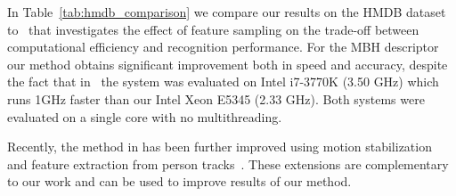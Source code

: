 \documentclass[10pt,twocolumn,letterpaper]{article}
\begin{document}
In Table~\ref{tab:hmdb_comparison} we compare our results on the HMDB dataset to~\cite{Feng13} that investigates the effect of feature sampling on the trade-off between computational efficiency and recognition performance. For the MBH descriptor our method obtains significant improvement both in speed and accuracy, despite the fact that in~\cite{Feng13} the system was evaluated on Intel i7-3770K (3.50 GHz) which runs 1GHz faster than our Intel Xeon E5345 (2.33 GHz). Both systems were evaluated on a single core with no multithreading.



Recently, the method in \cite{Wang12} has been further improved using motion stabilization~\cite{Jain13,Wang13} and feature extraction from person tracks~\cite{Wang13}. These extensions are complementary to our work and can be used to improve results of our method.
\end{document}
